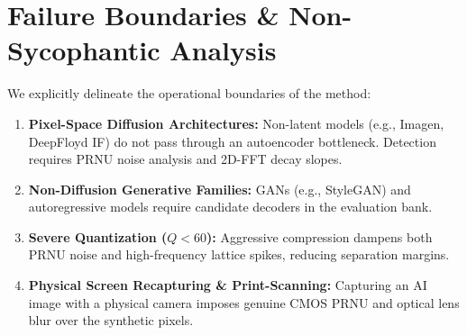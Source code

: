 \documentclass[conference]{IEEEtran}
\begin{document}
\begin{table}[t]
\caption{Adversarial Perturbation Stress-Test Results Across Image Degradations.}
\label{tab:adversarial_stress}
\centering
\small
{}
\end{table}

\section{Failure Boundaries \& Non-Sycophantic Analysis}
\label{sec:limitations}

We explicitly delineate the operational boundaries of the method:
\begin{enumerate}
    \item \textbf{Pixel-Space Diffusion Architectures:} Non-latent models (e.g., Imagen, DeepFloyd IF) do not pass through an autoencoder bottleneck. Detection requires PRNU noise analysis and 2D-FFT decay slopes.
    \item \textbf{Non-Diffusion Generative Families:} GANs (e.g., StyleGAN) and autoregressive models require candidate decoders in the evaluation bank.
    \item \textbf{Severe Quantization ($Q < 60$):} Aggressive compression dampens both PRNU noise and high-frequency lattice spikes, reducing separation margins.
    \item \textbf{Physical Screen Recapturing \& Print-Scanning:} Capturing an AI image with a physical camera imposes genuine CMOS PRNU and optical lens blur over the synthetic pixels.
\end{enumerate}
\end{document}
